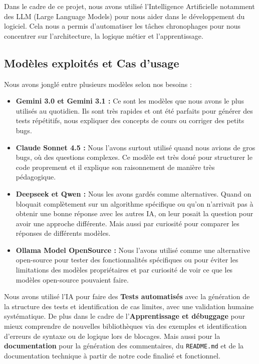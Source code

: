 \documentclass[a4paper]{article}
\begin{document}
Dans le cadre de ce projet, nous avons utilisé l'Intelligence Artificielle notamment des LLM (Large Language Models) pour nous aider dans le développement du logiciel.
Cela nous a permis d'automatiser les tâches chronophages pour nous concentrer sur l'architecture, la logique métier et l'apprentissage.

\subsection{Modèles exploités et Cas d'usage}
Nous avons jonglé entre plusieurs modèles selon nos besoins :
\begin{itemize}
    \item \textbf{Gemini 3.0 et Gemini 3.1 :} Ce sont les modèles que nous avons le plus utilisés au quotidien. Ils sont très rapides et ont été parfaits pour générer des tests répétitifs, nous expliquer des concepts de cours ou corriger des petits bugs.
    \item \textbf{Claude Sonnet 4.5 :} Nous l'avons surtout utilisé quand nous avions de gros bugs, où des questions complexes. Ce modèle est très doué pour structurer le code proprement et il explique son raisonnement de manière très pédagogique.
    \item \textbf{Deepseek et Qwen :} Nous les avons gardés comme alternatives. Quand on bloquait complètement sur un algorithme spécifique ou qu'on n'arrivait pas à obtenir une bonne réponse avec les autres IA, on leur posait la question pour avoir une approche différente. Mais aussi par curiosité pour comparer les réponses de différents modèles.
    \item \textbf{Ollama Model OpenSource :} Nous l'avons utilisé comme une alternative open-source pour tester des fonctionnalités spécifiques ou pour éviter les limitations des modèles propriétaires et par curiosité de voir ce que les modèles open-source pouvaient faire.
\end{itemize}

Nous avons utilisé l'IA pour faire des
\textbf{Tests automatisés}  avec la génération de la structure des tests et identification de cas limites, avec une validation humaine systématique.
De plus dans le cadre de l'\textbf{Apprentissage et débuggage} pour mieux comprendre de nouvelles bibliothèques via des exemples et identification d'erreurs de syntaxe ou de logique lors de blocages.
Mais aussi pour la \textbf{documentation } pour la génération des commentaires, du \texttt{README.md} et de la documentation technique à partir de notre code finalisé et fonctionnel.
\end{document}
